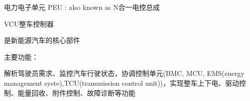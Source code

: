 \begin{frame}
	\begin{compactitem}
		\item 电力电子单元 PEU : also known as N合一电控总成
	\end{compactitem}
\end{frame}
\begin{frame}
	\begin{block}{VCU整车控制器}
		\begin{compactitem}
			\item 是新能源汽车的核心部件
			\item 主要功能：
			
				解析驾驶员需求、监控汽车行驶状态，协调控制单元(BMC, MCU, EMS(energy management syste),TCU(transmission control unit))，实现整车上下电、驱动控制、能量回收、附件控制、故障诊断等功能
		\end{compactitem}
	\end{block}
\end{frame}
